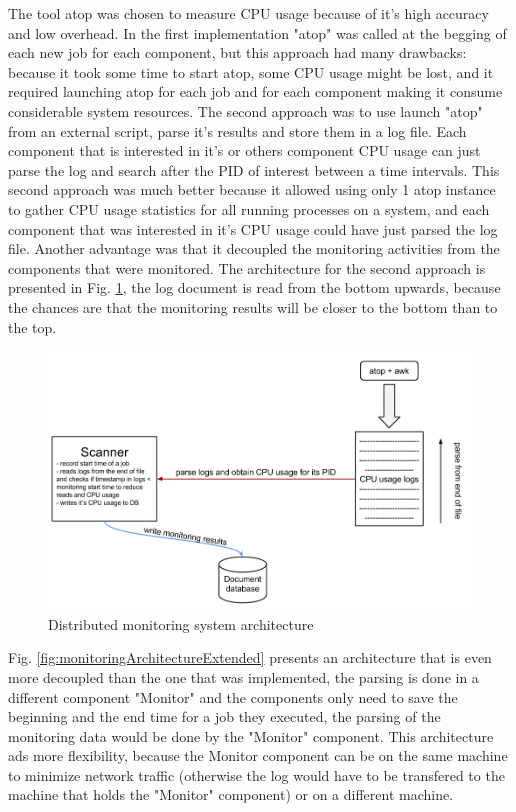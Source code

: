 \documentclass[fleqn,10pt]{./class/wlscirep}
\begin{document}
The tool atop was chosen to measure CPU usage because of it's high accuracy and low overhead. In the first implementation "atop" was called at the begging of each new job for each component, but this approach had many drawbacks: because it took some time to start atop, some CPU usage might be lost, and it required launching atop for each job and for each component making it consume considerable system resources. The second approach was to use launch "atop" from an external script, parse it's results and store them in a log file. Each component that is interested in it's or others component CPU usage can just parse the log and search after the PID of interest between a time intervals. This second approach was much better because it allowed using only 1 atop instance to gather CPU usage statistics for all running processes on a system, and each component that was interested in it's CPU usage could have just parsed the log file. Another advantage was that it decoupled the monitoring activities from the components that were monitored. The architecture for the second approach is presented in Fig. \ref{fig:monitoringArchitecture}, the log document is read from the bottom upwards, because the chances are that the monitoring results will be closer to the bottom than to the top.

\begin{figure}[ht]
\centering
\includegraphics[width=\linewidth]{./img/MonitoringCPUMechanism.png}
\caption{Distributed monitoring system architecture}
\label{fig:monitoringArchitecture}
\end{figure}

Fig. \ref{fig:monitoringArchitectureExtended}  presents an architecture that is even more decoupled than the one that was implemented, the parsing is done in a different component "Monitor" and the components only need to save the beginning and the end time for a job they executed, the parsing of the monitoring data would be done by the "Monitor" component. This architecture ads more flexibility, because the Monitor component can be on the same machine to minimize network traffic (otherwise the log would have to be transfered to the machine that holds the "Monitor" component) or on a different machine.
\end{document}
